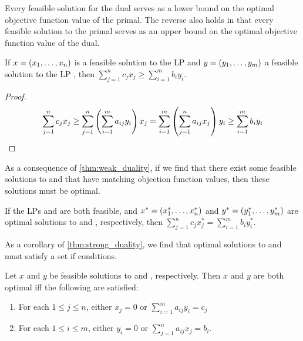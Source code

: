Every feasible solution for the dual serves as a lower bound on the optimal objective function 
value of the primal. The reverse also holds in that every feasible solution to the primal 
serves as an upper bound on the optimal objective function value of the dual. 

\begin{theorem}
    If $x = \left( x_1, \ldots, x_n \right) $ is a feasible solution to the LP \primal{} and $y = \left( y_1, \ldots, y_m \right) $ a feasible solution to the LP \dual{}, 
    then $\sum_{j=1}^{n} c_j x_j \geq \sum_{i=1}^{m} b_i y_i$. 
    \label{thm:weak_duality}
\end{theorem}
\begin{proof}
    \begin{align*}
        \sum_{j=1}^{n} c_j x_j \geq \sum_{j=1}^{n} \left( \sum_{i=1}^{m} a_{ij} y_i \right) x_j
        =  \sum_{i=1}^{m} \left( \sum_{j=1}^{n} a_{ij} x_j \right) y_i 
        \geq \sum_{i=1}^{m} b_i y_i
    \end{align*}
\end{proof}

As a consequence of \cref{thm:weak_duality}, if we find that there exist some 
feasible solutions to \primal{} and \dual{} that have matching objection function values, 
then these solutions must be optimal. 

\begin{theorem}
    If the LPs \primal{} and \dual{} are both feasible, and $x^{\ast} = \left( x_1^{\ast}, \ldots, x_n^{\ast} \right)$
    and $y^{\ast} = \left( y_1^{\ast}, \ldots, y_m^{\ast} \right)$ are optimal solutions to \primal{} and \dual{}, respectively, 
    then $\sum_{j=1}^{n} c_j x_j^{\ast} = \sum_{i=1}^{m} b_i y_i^{\ast}$. 
    \label{thm:strong_duality}
\end{theorem}

As a corollary of \cref{thm:strong_duality}, we find that optimal solutions to \primal{} and \dual{}
must satisfy a set if conditions. 

\begin{corollary}
    Let $x$ and $y$ be feasible solutions to \primal{} and \dual{}, respectively. Then 
    $x$ and $y$ are both optimal iff the following are satisfied:
    \begin{enumerate}
        \item For each $1 \leq j \leq n$, either $x_j = 0$ or $\sum_{i=1}^{m} a_{ij}y_i = c_j$
        \item For each $1 \leq i \leq m$, either $y_i = 0$ or $\sum_{j=1}^{n} a_{ij} x_j = b_i$. 
    \end{enumerate}
\end{corollary}

